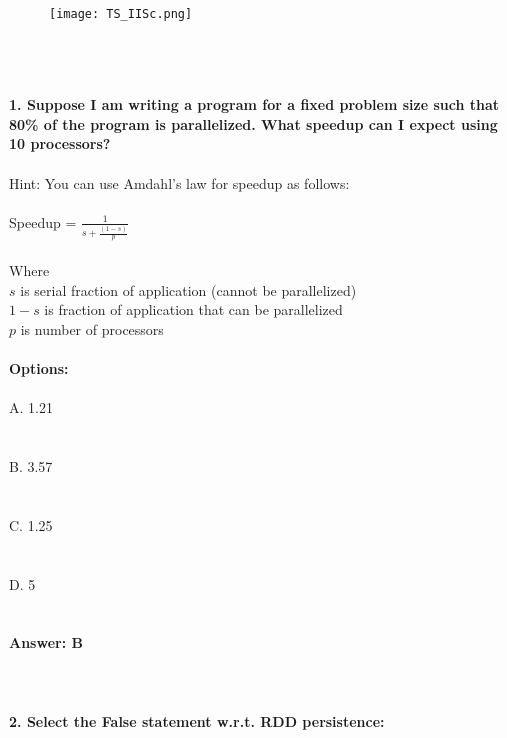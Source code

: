\documentclass[prl,twocolumn,showpacs,preprintnumbers,superscriptaddress]{revtex4}
\theoremstyle{plain}
\theoremstyle{definition}
\begin{document}
\begin{widetext}
\\
\\
\\
\begin{wrapfigure}
\centering
\end{wrapfigure}
\begin{figure}[h!]
 \begin{right}
  \hfill\texttt{[image: TS\_IISc.png]}
 \end{right}
\end{figure}
\\
\\
\\
\noindent\textbf{1. Suppose I am writing a program for a fixed problem size such that 80\% of the program is parallelized. What speedup can I expect using 10 processors?
}
\\
\\
Hint: You can use Amdahl’s law for speedup as follows:
\\
\\
Speedup = $\frac{1}{s +  \frac{(1 - s)}{p}}$
\\
\\
Where
\\
$s$ is serial fraction of application (cannot be parallelized)
\\
\(1 - s\) is fraction of application that can be parallelized
\\
$p$ is number of processors
\\
\\
\textbf{Options:}
\\
\\
\noindent A. 1.21
\\
\\
\\
B. 3.57
\\
\\
\\
C. 1.25
\\
\\
\\
D. 5
\\
\\
\\
\textbf{Answer: B}
\\
\\
\\
\\
\textbf{2. Select the False statement w.r.t. RDD persistence:}
\\

\end{widetext}
\end{document}
